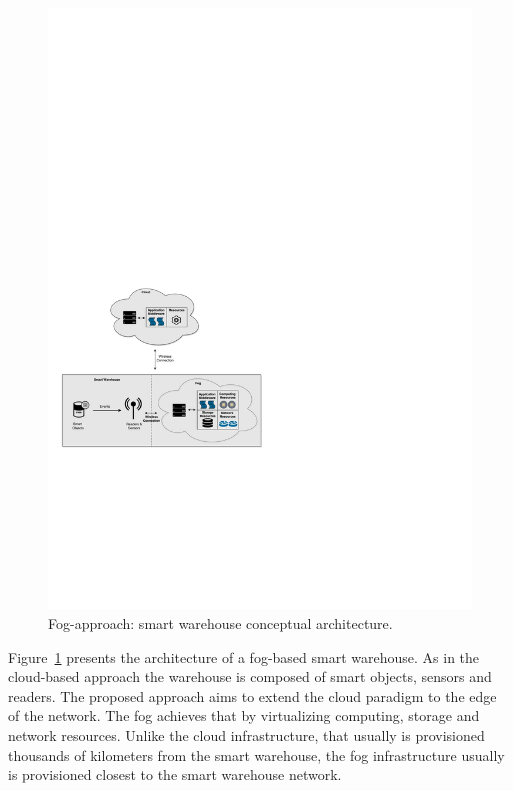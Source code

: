 \begin{figure}[ht!]
  \centering
  \includegraphics[width=\textwidth]{./images/solution_fog_architecture}
  \caption[Fog-approach: conceptual architecture.]{Fog-approach: smart warehouse conceptual architecture.}
  \label{fig:solution_fog_architecture}
\end{figure}

Figure~\ref{fig:solution_fog_architecture} presents the architecture of a fog-based smart warehouse.
As in the cloud-based approach the warehouse is composed of smart objects, sensors and readers.
The proposed approach aims to extend the cloud paradigm to the edge of the network. The fog achieves
that by virtualizing computing, storage and network resources. Unlike the cloud infrastructure, that
usually is provisioned thousands of kilometers from the smart warehouse, the fog infrastructure
usually is provisioned closest to the smart warehouse network.\\

